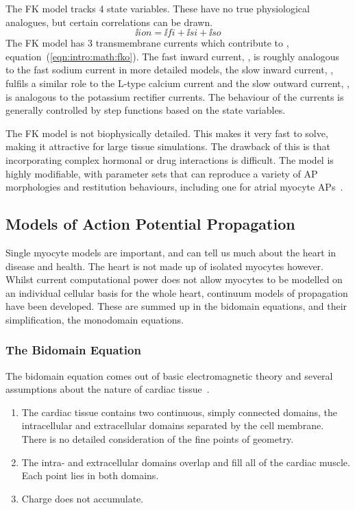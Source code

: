 The FK model tracks 4 state variables.
These have no true physiological analogues, but certain correlations can be
drawn.
\begin{equation}
\label{eqn:intro:math:fko}
\ii{ion} = \ii{fi} + \ii{si} + \ii{so}
\end{equation}
The FK model has 3 transmembrane currents which contribute to ,
equation~(\ref{eqn:intro:math:fko}).
The fast inward current, , is roughly analogous to the fast sodium
current in more detailed models, the slow inward current, , fulfils a
similar role to the L-type calcium current and the slow outward current, ,
is analogous to the potassium rectifier currents.
The behaviour of the currents is generally controlled by step functions based
on the state variables.

The FK model is not biophysically detailed.
This makes it very fast to solve, making it attractive for large tissue
simulations.
The drawback of this is that incorporating complex hormonal or drug interactions
is difficult.
The model is highly modifiable, with parameter sets that can reproduce a variety
of AP morphologies and restitution behaviours, including one for atrial myocyte
APs~\cite{Weber2008}.

\subsection{Models of Action Potential Propagation}

Single myocyte models are important, and can tell us much about the heart in
disease and health.
The heart is not made up of isolated myocytes however.
Whilst current computational power does not allow myocytes to be modelled on an
individual cellular basis for the whole heart, continuum models of propagation
have been developed.
These are summed up in the bidomain equations, and their simplification, the
monodomain equations.

\subsubsection{The Bidomain Equation}

The bidomain equation comes out of basic electromagnetic theory and several
assumptions about the nature of cardiac tissue~\cite{Tung1978,Geselowitz1983}.
\begin{enumerate}
    \item The cardiac tissue contains two continuous, simply connected domains,
    the intracellular and extracellular domains separated by the cell membrane.
    There is no detailed consideration of the fine points of geometry.
    \item The intra- and extracellular domains overlap and fill all of the cardiac muscle. Each point lies in both domains.
    \item Charge does not accumulate.
\end{enumerate}

